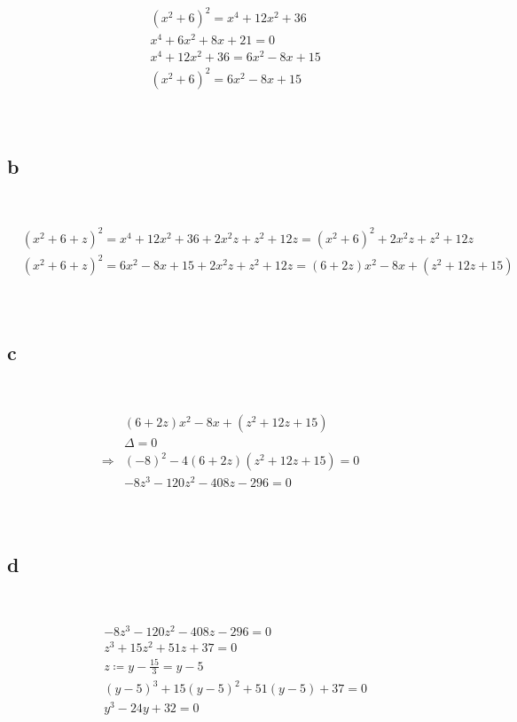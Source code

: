 \documentclass{article}
\begin{document}
~

\begin{align*}
    &(x^2+6)^2=x^4+12x^2+36\\
    &x^4+6x^2+8x+21=0\\
    &x^4+12x^2+36=6x^2-8x+15\\
    &(x^2+6)^2=6x^2-8x+15\\
\end{align*}

~

\subsection*{b}

~

\begin{align*}
    &(x^2+6+z)^2=x^4+12x^2+36+2x^2z+z^2+12z=(x^2+6)^2+2x^2z+z^2+12z\\
    &(x^2+6+z)^2=6x^2-8x+15+2x^2z+z^2+12z=(6+2z)x^2-8x+(z^2+12z+15)\\
\end{align*}

~

\subsection*{c}

~

\begin{align*}
    &(6+2z)x^2-8x+(z^2+12z+15)\\
    &\Delta=0\\
    \Rightarrow&(-8)^2-4(6+2z)(z^2+12z+15)=0\\
    &-8z^3-120z^2-408z-296=0\\
\end{align*}

~

\subsection*{d}

~

\begin{align*}
    &-8z^3-120z^2-408z-296=0\\
    &z^3+15z^2+51z+37=0\\
    &z\coloneqq y-\frac{15}{3}=y-5\\
    &(y-5)^3+15(y-5)^2+51(y-5)+37=0\\
    &y^3-24y+32=0\\
\end{align*}
\end{document}

